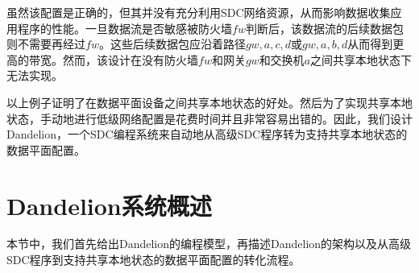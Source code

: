 
虽然该配置是正确的，但其并没有充分利用SDC网络资源，从而影响数据收集应用程序的性能。一旦数据流是否敏感被防火墙$fw$判断后，该数据流的后续数据包则不需要再经过$fw$。这些后续数据包应沿着路径$gw, a, c, d$或$gw, a, b, d$从而得到更高的带宽。然而，该设计在没有防火墙$fw$和网关$gw$和交换机$a$之间共享本地状态下无法实现。


以上例子证明了在数据平面设备之间共享本地状态的好处。然后为了实现共享本地状态，手动地进行低级网络配置是花费时间并且非常容易出错的。因此，我们设计Dandelion，一个SDC编程系统来自动地从高级SDC程序转为支持共享本地状态的数据平面配置。


\section{Dandelion系统概述}

本节中，我们首先给出Dandelion的编程模型，再描述Dandelion的架构以及从高级SDC程序到支持共享本地状态的数据平面配置的转化流程。


